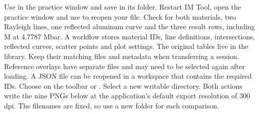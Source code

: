 Use  in the practice window and save  in its  folder. Restart IM Tool, open the practice window and use  to reopen your file. Check for both materials, two Rayleigh lines, one reflected aluminum curve and the three result rows, including M at 4.7787 Mbar.
A workflow stores material IDs, line definitions, intersections, reflected curves, scatter points and plot settings. The original tables live in the library. Keep their matching files and metadata when transferring a session. Reference overlays have separate files and may need to be selected again after loading. A JSON file can be reopened in a workspace that contains the required IDs.
Choose  on the toolbar or . Select a new writable directory. Both actions write the nine PNGs below at the application's default export resolution of 300 dpi. The filenames are fixed, so use a new folder for each comparison.

